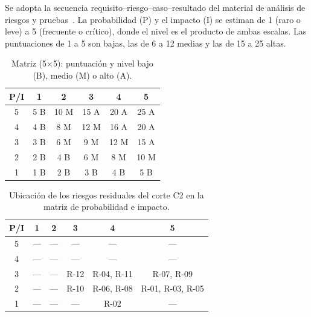 Se adopta la secuencia requisito--riesgo--caso--resultado del material de análisis de riesgos y pruebas~\cite{riskTestingGuide}. La probabilidad (P) y el impacto (I) se estiman de 1 (raro o leve) a 5 (frecuente o crítico), donde el nivel es el producto de ambas escalas. Las puntuaciones de 1 a 5 son bajas, las de 6 a 12 medias y las de 15 a 25 altas.

\begin{table}[H]
	\centering\small
	\begin{tabular}{c|ccccc}
		\toprule
		\textbf{P/I} & \textbf{1} & \textbf{2} & \textbf{3} & \textbf{4} & \textbf{5} \\
		\midrule
		5            & 5 B        & 10 M       & 15 A       & 20 A       & 25 A       \\
		4            & 4 B        & 8 M        & 12 M       & 16 A       & 20 A       \\
		3            & 3 B        & 6 M        & 9 M        & 12 M       & 15 A       \\
		2            & 2 B        & 4 B        & 6 M        & 8 M        & 10 M       \\
		1            & 1 B        & 2 B        & 3 B        & 4 B        & 5 B        \\
		\bottomrule
	\end{tabular}
	\caption{Matriz (5\ensuremath{\times}5): puntuación y nivel bajo (B), medio (M) o alto (A).}
	\label{tabla:matriz-riesgos}
\end{table}

\begin{table}[H]
	\centering\small
	\setlength{\tabcolsep}{5pt}
	\begin{tabular}{c|ccccc}
		\toprule
		\textbf{P/I} & \textbf{1} & \textbf{2} & \textbf{3} & \textbf{4} & \textbf{5}       \\
		\midrule
		5            & ---        & ---        & ---        & ---        & ---              \\
		4            & ---        & ---        & ---        & ---        & ---              \\
		3            & ---        & ---        & R-12       & R-04, R-11 & R-07, R-09       \\
		2            & ---        & ---        & R-10       & R-06, R-08 & R-01, R-03, R-05 \\
		1            & ---        & ---        & ---        & R-02       & ---              \\
		\bottomrule
	\end{tabular}
	\caption{Ubicación de los riesgos residuales del corte C2 en la matriz de probabilidad e impacto.}
	\label{tabla:matriz-riesgos-c2}
\end{table}

